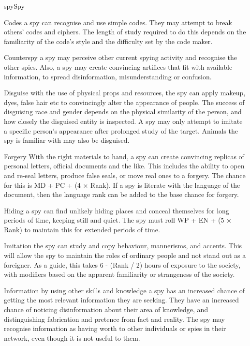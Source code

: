 \begin{Skill}[2.0]{spy}{Spy}
\begin{Description}
\item[Codes] a spy can recognise and use simple codes.  They may
  attempt to break others’ codes and ciphers.  The length of study
  required to do this depends on the familiarity of the code’s style
  and the difficulty set by the code maker.

\item[Counterspy] a spy may perceive other current spying activity and
  recognise the other spies. Also, a spy may create convincing
  artifices that fit with available information, to spread
  disinformation, misunderstanding or confusion.

\item[Disguise] with the use of physical props and resources, the spy
  can apply makeup, dyes, false hair etc to convincingly alter the
  appearance of people.  The success of disguising race and gender
  depends on the physical similarity of the person, and how closely
  the disguised entity is inspected. A spy may only attempt to imitate
  a specific person’s appearance after prolonged study of the
  target.  Animals the spy is familiar with may also be disguised.

\item[Forgery] With the right materials to hand, a spy can create
  convincing replicas of personal letters, official documents and the
  like.  This includes the ability to open and re-seal letters,
  produce false seals, or move real ones to a forgery.  The chance for
  this is MD + PC + (4 × Rank). If a spy is literate with the language
  of the document, then the language rank can be added to the base
  chance for forgery.

\item[Hiding] a spy can find unlikely hiding places and conceal
  themselves for long periods of time, keeping still and quiet. The
  spy must roll WP + EN + (5 × Rank) to maintain this for extended
  periods of time.

\item[Imitation] the spy can study and copy behaviour, mannerisms, and
  accents. This will allow the spy to maintain the roles of ordinary
  people and not stand out as a foreigner.  As a guide, this takes 6 -
  (Rank / 2) hours of exposure to the society, with modifiers based on
  the apparent familiarity or strangeness of the society.

\item[Information] by using other skills and knowledge a spy has an
  increased chance of getting the most relevant information they are
  seeking.  They have an increased chance of noticing disinformation
  about their area of knowledge, and distinguishing fabrication and
  pretence from fact and reality.  The spy may recognise information
  as having worth to other individuals or spies in their network, even
  though it is not useful to them.


\end{Description}
\end{Skill}
